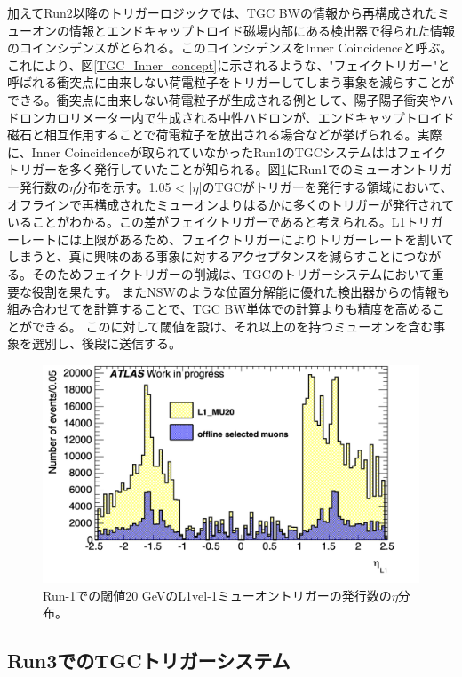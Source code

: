 加えてRun2以降のトリガーロジックでは、TGC BWの情報から再構成されたミューオンの情報とエンドキャップトロイド磁場内部にある検出器で得られた情報のコインシデンスがとられる。このコインシデンスをInner Coincidenceと呼ぶ。これにより、図\ref{TGC_Inner_concept}に示されるような、"フェイクトリガー"と呼ばれる衝突点に由来しない荷電粒子をトリガーしてしまう事象を減らすことができる。衝突点に由来しない荷電粒子が生成される例として、陽子陽子衝突やハドロンカロリメーター内で生成される中性ハドロンが、エンドキャップトロイド磁石と相互作用することで荷電粒子を放出される場合などが挙げられる。実際に、Inner Coincidenceが取られていなかったRun1のTGCシステムははフェイクトリガーを多く発行していたことが知られる。図\ref{TGC_faketrigger}にRun1でのミューオントリガー発行数の$\eta$分布を示す。1.05 < |$\eta$|のTGCがトリガーを発行する領域において、オフラインで再構成されたミューオンよりはるかに多くのトリガーが発行されていることがわかる。この差がフェイクトリガーであると考えられる。L1トリガーレートには上限があるため、フェイクトリガーによりトリガーレートを割いてしまうと、真に興味のある事象に対するアクセプタンスを減らすことにつながる。そのためフェイクトリガーの削減は、TGCのトリガーシステムにおいて重要な役割を果たす。
またNSWのような位置分解能に優れた検出器からの情報も組み合わせて\pt を計算することで、TGC BW単体での計算よりも精度を高めることができる。
この\pt に対して閾値を設け、それ以上の\pt を持つミューオンを含む事象を選別し、後段に送信する。

\begin{figure} 
\centering
\includegraphics[width=16cm]{fig/Intro/TGC_faketrigger.png}
\caption[Run-1での\pt 閾値]{Run-1での\pt 閾値20 GeVのL1vel-1ミューオントリガーの発行数の$\eta$分布。}
\label{TGC_faketrigger}
\end{figure}



    \subsection{Run3でのTGCトリガーシステム}

